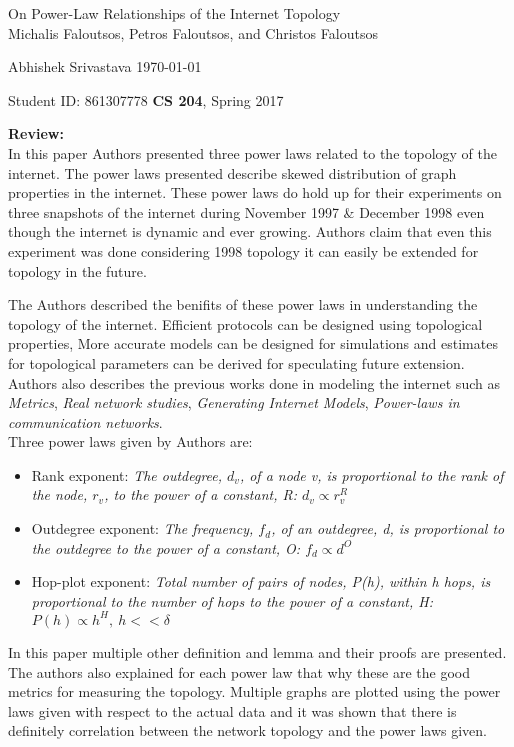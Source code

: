 \documentclass[a4paper,12pt, twoside]{article}
\renewcommand{\maketitle}{%
 	\Large
 	\begin{center}
 	On Power-Law Relationships of the Internet Topology\\	
 	\normalsize Michalis Faloutsos, Petros Faloutsos, and Christos Faloutsos
 	\end{center}
 
 	\Large
	Abhishek Srivastava
	\hfill
	\normalsize
	\today
 	\par
 	Student ID: 861307778
 	\hfill
 	\textbf{CS 204}, Spring 2017
 	\par 	
 	\hrulefill
 	\par
 	}
\begin{document}
\thispagestyle{empty}
	
\maketitle

\textbf{Review:}\\

In this paper Authors presented three power laws related to the topology of the internet. The power laws presented describe skewed distribution of graph properties in the internet. These power laws do hold up for their experiments on three snapshots of the internet during November 1997 \& December 1998 even though the internet is dynamic and ever growing. Authors claim that even this experiment was done considering 1998 topology it can easily be extended for topology in the future. 

The Authors described the benifits  of these power laws in understanding the topology of the internet. Efficient protocols can be designed using topological properties, More accurate models can be designed for simulations and estimates for topological parameters can be derived for speculating future extension. Authors also describes the previous works done in modeling the internet such as \emph{Metrics}, \emph{Real network studies}, \emph{Generating Internet Models}, \emph{Power-laws in communication networks}.\\

Three power laws given by Authors are:
\begin{itemize}
	\item Rank exponent: \emph{The outdegree, $d_v$, of a node v, is proportional to the rank of the node, $r_v$, to the power of a constant, R: $d_v \propto r^{R}_v$ }
	\item Outdegree exponent: \emph{The frequency, $f_d$, of an outdegree, d, is proportional to the outdegree to the power of a constant, O: $f_d \propto d^O$}
	\item Hop-plot exponent: \emph{Total number of pairs of nodes, P(h), within h hops, is proportional to the number of hops to the power of a constant, H: $P(h) \propto h^H,~h<< \delta $}
\end{itemize}
In this paper multiple other definition and lemma and their proofs are presented. The authors also explained for each power law that why these are the good metrics for measuring the topology. Multiple graphs are plotted using the power laws given with respect to the actual data and it was shown that there is definitely correlation between the network topology and the power laws given.\\
\end{document}
